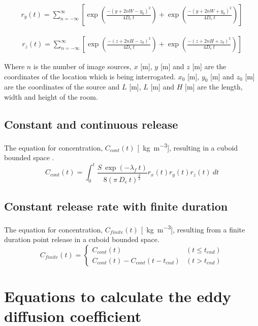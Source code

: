 \documentclass[]{article}
\begin{document}
\begin{eqnarray}
	r_{y}(t) = \sum^{\infty}_{n = -\infty} \left[\exp\left(\frac{-(y + 2nW-
	y_{0})^{2}}{4D_e\:t}\right) + \exp\left(\frac{-(y + 2nW +
	y_{0})^{2}}{4D_e\:t}\right)\right]
\end{eqnarray}

\begin{eqnarray}
	r_{z}(t) = \sum^{\infty}_{n = -\infty} \left[\exp\left(\frac{-(z + 2nH -
	z_{0})^{2}}{4D_e\:t}\right) + \exp\left(\frac{-(z + 2nH +
	z_{0})^{2}}{4D_e\:t}\right)\right]
\end{eqnarray}

Where $n$ is the number of image sources, $x$ [m], $y$ [m] and $z$ [m] are the
coordinates of the location which is being interrogated. $x_0$ [m], $y_0$ [m]
and $z_0$ [m] are the coordinates of the source and $L$ [m], $L$ [m] and $H$ [m]
are the length, width and height of the room. 

\subsection{Constant and continuous release}\label{sec:EddyCont}

The equation for concentration, $C_{cont}(t)$
[\SI{}{\kilo\gram\per\meter\cubed}], resulting in a cuboid bounded space
\cite{cheng11}. 
\begin{equation}\label{eq:modelCont}
	C_{cont}(t) = \int^{t}_0  \frac{S\: \exp(-\lambda_f\:t)}{8(\pi\:D_e\:t)^{\frac{3}{2}}} r_{x}(t) r_{y}(t) r_{z}(t)\:dt
\end{equation}

\subsection{Constant release rate with finite duration}\label{sec:EddyFinite}

The equation for concentration, $C_{finite}(t)$
[\SI{}{\kilo\gram\per\meter\cubed}], resulting from a finite duration point
release in a cuboid bounded space. 
\begin{equation}\label{eq:modelFiniteDuration}
	C_{finite}(t) = 
	\begin{cases} 
		C_{cont}(t)															& (t \leq t_{end}) \\
		C_{cont}(t) - C_{cont}(t - t_{end})			& (t > t_{end})
	\end{cases} 
\end{equation}

\section{Equations to calculate the eddy diffusion coefficient}\label{app:tkeb}
\end{document}
